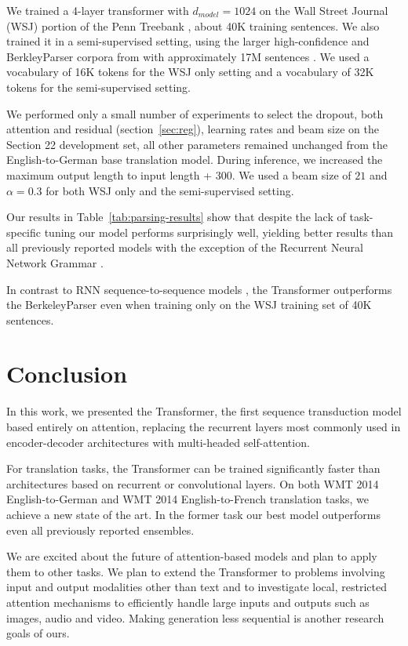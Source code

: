 \documentclass{article}
\begin{document}
We trained a 4-layer transformer with $d_{model} = 1024$ on the Wall Street Journal (WSJ) portion of the Penn Treebank \citep{marcus1993building}, about 40K training sentences. We also trained it in a semi-supervised setting, using the larger high-confidence and BerkleyParser corpora from with approximately 17M sentences \citep{KVparse15}. We used a vocabulary of 16K tokens for the WSJ only setting and a vocabulary of 32K tokens for the semi-supervised setting.

We performed only a small number of experiments to select the dropout, both attention and residual (section~\ref{sec:reg}), learning rates and beam size on the Section 22 development set, all other parameters remained unchanged from the English-to-German base translation model. During inference, we increased the maximum output length to input length + $300$. We used a beam size of $21$ and $\alpha=0.3$ for both WSJ only and the semi-supervised setting.

Our results in Table~\ref{tab:parsing-results} show that despite the lack of task-specific tuning our model performs surprisingly well, yielding better results than all previously reported models with the exception of the Recurrent Neural Network Grammar \cite{dyer-rnng:16}.

In contrast to RNN sequence-to-sequence models \citep{KVparse15}, the Transformer outperforms the BerkeleyParser \cite{petrov-EtAl:2006:ACL} even when training only on the WSJ training set of 40K sentences.
 
\section{Conclusion}
In this work, we presented the Transformer, the first sequence transduction model based entirely on attention, replacing the recurrent layers most commonly used in encoder-decoder architectures with multi-headed self-attention.

For translation tasks, the Transformer can be trained significantly faster than architectures based on recurrent or convolutional layers. On both WMT 2014 English-to-German and WMT 2014 English-to-French translation tasks, we achieve a new state of the art. In the former task our best model outperforms even all previously reported ensembles. 

We are excited about the future of attention-based models and plan to apply them to other tasks. We plan to extend the Transformer to problems involving input and output modalities other than text and to investigate local, restricted attention mechanisms to efficiently handle large inputs and outputs such as images, audio and video.
Making generation less sequential is another research goals of ours.
\end{document}
